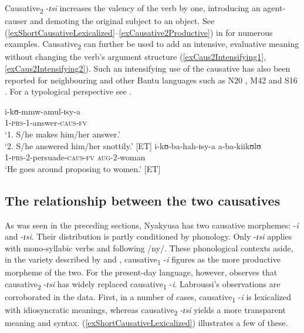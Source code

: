 Causative\textsubscript{2} -\textit{ɪsi} increases the valency of the verb by one, introducing an agent-causer and demoting the original subject to an object. See (\ref{exShortCausativeLexicalized}--\ref{exCausative2Productive}) in  for numerous examples. Causative\textsubscript{2} can further be used to add an intensive, evaluative meaning without changing the verb's argument structure (\ref{exCaus2Intensifying1}, \ref{exCaus2Intensifying2}). Such an intensifying use of the causative has also been reported for neighbouring  \citep[73f]{BotneR2003} and other Bantu languages such as  N20 \citep[78f]{IntensiveChichewa},  M42 \citep[83--92]{vanSambeekJ1955} and  S16 \citep[397]{MathangwaneJ2001}. For a typological perspective see \citet{KittilaeS2009}.
\begin{exe}
\ex \label{exCaus2Intensifying1}\gll i-kʊ-mmw-amul-ɪsy-a\\
1-\textsc{prs}-1-answer-\textsc{caus}-\textsc{fv}\\
\glt `1. S/he makes him/her answer.'\\
`2. S/he answered him/her snottily.' [ET]
\ex \label{exCaus2Intensifying2}\gll i-kʊ-ba-hah-ɪsy-a a-ba-kiikʊlʊ\\
1-\textsc{prs}-2-persuade-\textsc{caus}-\textsc{fv} \textsc{aug}-2-woman\\
\glt `He goes around proposing to women.' [ET]
\end{exe}

\subsection{The relationship between the two causatives}
\label{TwoCausatives}
As was seen in the preceding sections, Nyakyusa has two causative morphemes: -\textit{i} and -\textit{ɪsi}. Their distribution is partly conditioned by phonology. Only -\textit{ɪsi} applies with mono-syllabic verbs and following /ny/. These phonological contexts aside, in the variety described by \citet{SchumannK1899} and \citet{EndemannC1914}, causative\textsubscript{1} -\textit{i} figures as the more productive morpheme of the two. For the present-day language, however, \citet{LabroussiC1999} observes that causative\textsubscript{2} -\textit{ɪsi} has widely replaced causative\textsubscript{1} -\textit{i}. Labroussi's observations are corroborated in the data. First, in a number of cases, causative\textsubscript{1} -\textit{i} is lexicalized with idiosyncratic meanings, whereas causative\textsubscript{2} -\textit{ɪsi} yields a more transparent meaning and syntax. (\ref{exShortCausativeLexicalized}) illustrates a few of these.

